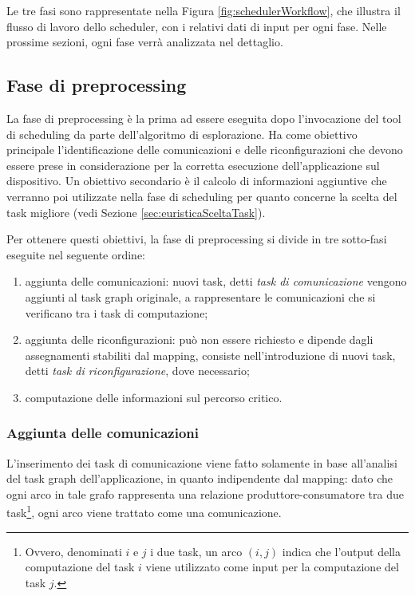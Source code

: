 Le tre fasi sono rappresentate nella Figura \ref{fig:schedulerWorkflow}, che 
illustra il flusso di lavoro dello scheduler, con i relativi dati di input per 
ogni fase. Nelle prossime sezioni, ogni fase verrà analizzata nel dettaglio.


\subsection{Fase di preprocessing}
La fase di preprocessing è la prima ad essere eseguita dopo l'invocazione del 
tool di scheduling da parte dell'algoritmo di esplorazione. Ha come obiettivo 
principale l'identificazione delle comunicazioni e delle riconfigurazioni che 
devono essere prese in considerazione per la corretta esecuzione 
dell'applicazione sul dispositivo. Un obiettivo secondario è il calcolo di 
informazioni aggiuntive che verranno poi utilizzate nella fase di scheduling 
per quanto concerne la scelta del task migliore (vedi Sezione 
\ref{sec:euristicaSceltaTask}).

Per ottenere questi obiettivi, la fase di preprocessing si divide in tre 
sotto-fasi eseguite nel seguente ordine:
\begin{enumerate}
 \item aggiunta delle comunicazioni: nuovi task, detti \emph{task di 
comunicazione} vengono aggiunti al task graph originale, a rappresentare le 
comunicazioni che si verificano tra i task di computazione;
 \item aggiunta delle riconfigurazioni: può non essere richiesto e dipende 
dagli assegnamenti stabiliti dal mapping, consiste nell'introduzione di nuovi 
task, detti \emph{task di riconfigurazione}, dove necessario;
 \item computazione delle informazioni sul percorso critico.
\end{enumerate}

\subsubsection{Aggiunta delle comunicazioni}
L'inserimento dei task di comunicazione viene fatto solamente in base 
all'analisi del task graph dell'applicazione, in quanto indipendente dal 
mapping: dato che ogni arco in tale grafo rappresenta una relazione 
produttore-consumatore tra due task\footnote{Ovvero, denominati $i$ e $j$ i due 
task, un arco $(i,j)$ indica che l'output della computazione del task $i$ viene 
utilizzato come input per la computazione del task $j$.}, ogni arco viene 
trattato come una comunicazione.

